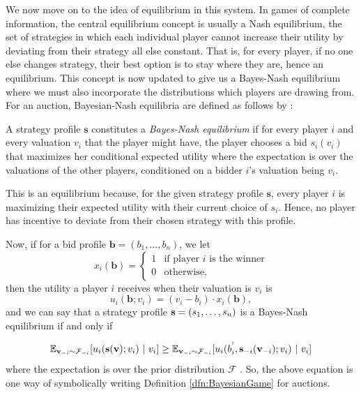 \documentclass[12pt,twoside]{reedthesis}
\begin{document}
We now move on to the idea of equilibrium in this system. In games of complete information, the central equilibrium concept is usually a Nash equilibrium, the set of strategies in which each individual player cannot increase their utility by deviating from their strategy all else constant. That is, for every player, if no one else changes strategy, their best option is to stay where they are, hence an equilibrium. This concept is now updated to give us a Bayes-Nash equilibrium where we must also incorporate the distributions which players are drawing from. For an auction, Bayesian-Nash equilibria are defined as follows by \cite{Roughgarden2017}:

\begin{dfn}
	A strategy profile $\textbf{s}$ constitutes a {\em Bayes-Nash equilibrium} if for every player $i$ and every valuation $v_i$ that the player might have, the player chooses a bid $s_i(v_i)$ that maximizes her conditional expected utility where the expectation is over the valuations of the other players, conditioned on a bidder $i$'s valuation being $v_i$.
	\label{dfn:BayesNashEQ} 
\end{dfn}
This is an equilibrium because, for the given strategy profile $\textbf{s}$, every player $i$ is maximizing their expected utility with their current choice of $s_i$. Hence, no player has incentive to deviate from their chosen strategy with this profile.
 
 Now, if for a bid profile $\textbf{b} = (b_1, \ldots, b_n)$, we let 
\[
	x_i(\textbf{b}) =
	\begin{cases}
		1 & \text{if player $i$ is the winner} \\
		0 & \text{otherwise},
	\end{cases}
\]
then the utility a player $i$ receives when their valuation is $v_i$ is 
$$u_i(\textbf{b}; v_i) = (v_i - b_i) \cdot x_i(\textbf{b}),$$ and we can say that a strategy profile $\textbf{s} = (s_1, \ldots, s_n)$ is a Bayes-Nash equilibrium if and only if


$$ \mathbb{E}_{\textbf{v}_{-i} \sim \mathcal{F}_{-i}} [u_i(\textbf{s} (\textbf{v}); v_i) \ | \ v_i] \geq \mathbb{E}_{\textbf{v}_{-i} \sim \mathcal{F}_{-i}} [u_i(b^{'}_i, \textbf{s}_{-i}(\textbf{v}_{-i}); v_i) \ | \ v_i] $$ where the expectation is over the prior distribution $\mathcal{F}$ \citep{Roughgarden2017}. So, the above equation is one way of symbolically writing Definition \ref{dfn:BayesianGame} for auctions.
\end{document}
